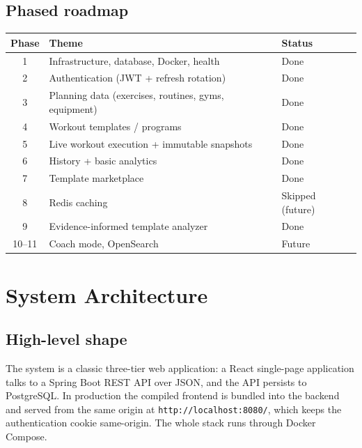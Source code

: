 \documentclass[11pt,a4paper]{article}
\begin{document}
\subsection{Phased roadmap}
\begin{center}
\begin{tabular}{@{}cll@{}}
\toprule
Phase & Theme & Status \\
\midrule
1 & Infrastructure, database, Docker, health & Done \\
2 & Authentication (JWT + refresh rotation) & Done \\
3 & Planning data (exercises, routines, gyms, equipment) & Done \\
4 & Workout templates / programs & Done \\
5 & Live workout execution + immutable snapshots & Done \\
6 & History + basic analytics & Done \\
7 & Template marketplace & Done \\
8 & Redis caching & Skipped (future) \\
9 & Evidence-informed template analyzer & Done \\
10--11 & Coach mode, OpenSearch & Future \\
\bottomrule
\end{tabular}
\end{center}

\section{System Architecture}

\subsection{High-level shape}
The system is a classic three-tier web application: a React single-page application talks to a
Spring Boot REST API over JSON, and the API persists to PostgreSQL. In production the compiled
frontend is bundled into the backend and served from the same origin at \verb|http://localhost:8080/|,
which keeps the authentication cookie same-origin. The whole stack runs through Docker Compose.
\end{document}
